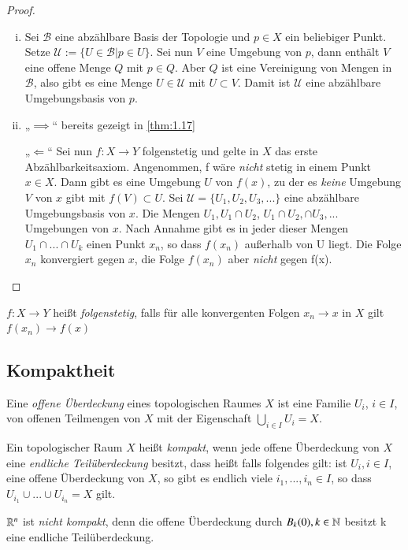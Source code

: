 \documentclass[a4paper,10pt]{scrartcl}
\begin{document}
\begin{proof}
 \begin{enumerate}[(i)]
  \item Sei $\mathcal B$ eine abzählbare Basis der Topologie und $p\in X$ ein beliebiger Punkt. Setze $\mathcal U:=\{U\in \mathcal{B} |p\in U\}$. Sei nun $V$ eine Umgebung von $p$, dann enthält $V$ eine offene Menge $Q$ mit $p\in Q$. Aber $Q$ ist eine Vereinigung von Mengen in $\mathcal B$, also gibt es eine Menge $U\in \mathcal U$ mit  $U \subset V$. Damit ist $ \mathcal U $ eine abzählbare Umgebungsbasis von $p$.
\item \begin{seg}{„$\implies$“} bereits gezeigt in \ref{thm:1.17} \end{seg}
\begin{seg}{„$\Longleftarrow$“} Sei nun $f:X\to Y$ folgenstetig und gelte in $X$ das erste Abzählbarkeitsaxiom. Angenommen, f wäre \emph{nicht} stetig in einem Punkt $x\in X$. Dann gibt es eine Umgebung $U$ von $f(x)$, zu der es \emph{keine} Umgebung $V$ von $x$ gibt mit $f(V)\subset U$. Sei $\mathcal U=\{U_1,U_2,U_3,...\}$ eine abzählbare Umgebungsbasis von $x$. Die Mengen $U_1, U_1\cap U_2$, $U_1\cap U_2,\cap U_3,...$ Umgebungen von $x$. Nach Annahme gibt es in jeder dieser Mengen $U_1\cap...\cap U_k$ einen Punkt $x_n$, so dass $f(x_n)$ außerhalb von U liegt. Die Folge $x_n$ konvergiert gegen $x$, die Folge $f(x_n)$ aber \emph{nicht} gegen f(x).
\end{seg}
\end{enumerate}
\end{proof}
\begin{note}
 $f: X\to Y$ heißt \emph{folgenstetig}, falls für alle konvergenten Folgen $x_n\to x$ in $X$ gilt $f(x_n)\to f(x)$ 
\end{note}
\subsection{Kompaktheit}
\begin{df}\label{thm:6.1}
 Eine \emph{offene Überdeckung} eines topologischen Raumes $X$ ist eine Familie $U_i$, $i\in I$, von offenen Teilmengen von $X$ mit der Eigenschaft $\bigcup_{i\in I} U_i=X$.
\end{df}
\begin{df}\label{thm:6.2}
 Ein topologischer Raum $X$ heißt \emph{kompakt}, wenn jede offene Überdeckung von $X$ eine \emph{endliche Teilüberdeckung} besitzt, dass heißt falls folgendes gilt: ist $U_i, i\in I$, eine offene Überdeckung von $X$, so gibt es endlich viele $i_1, ...,i_n\in I$, so dass $U_{i_1}\cup ...\cup U_{i_n}=X$ gilt.
\end{df}
\begin{ex*}
 $\mathbb{R}^n$ ist \emph{nicht kompakt}, denn die offene Überdeckung durch $B_k(0),k\in \mathbb{N}$ besitzt k          eine endliche Teilüberdeckung.
\end{ex*}
\end{document}
